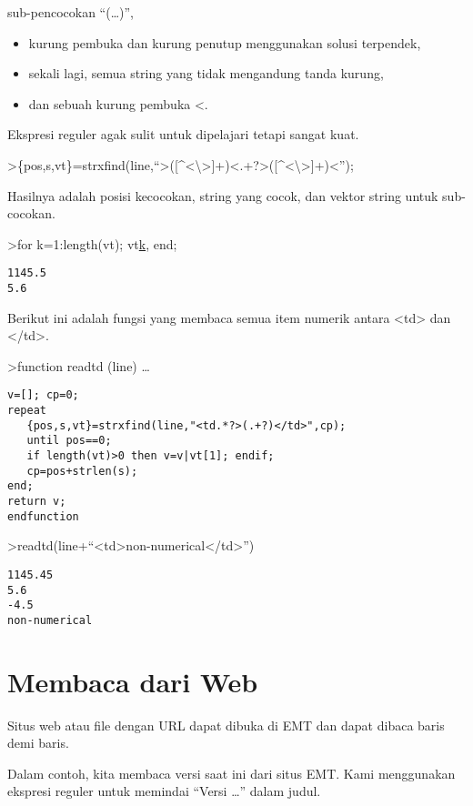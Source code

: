 \documentclass[
]{book}
\begin{document}
sub-pencocokan ``(\ldots)'',

\begin{itemize}
\item
  kurung pembuka dan kurung penutup menggunakan solusi terpendek,
\item
  sekali lagi, semua string yang tidak mengandung tanda kurung,
\item
  dan sebuah kurung pembuka \textless.
\end{itemize}

Ekspresi reguler agak sulit untuk dipelajari tetapi sangat kuat.

\textgreater\{pos,s,vt\}=strxfind(line,``\textgreater({[}\^{}\textless\textbackslash\textgreater{]}+)\textless.+?\textgreater({[}\^{}\textless\textbackslash\textgreater{]}+)\textless{}'');

Hasilnya adalah posisi kecocokan, string yang cocok, dan vektor string untuk sub-cocokan.

\textgreater for k=1:length(vt); vt\href{}{k}, end;

\begin{verbatim}
1145.5
5.6
\end{verbatim}

Berikut ini adalah fungsi yang membaca semua item numerik antara \textless td\textgreater{} dan \textless/td\textgreater.

\textgreater function readtd (line) \ldots{}

\begin{verbatim}
v=[]; cp=0;
repeat
   {pos,s,vt}=strxfind(line,"<td.*?>(.+?)</td>",cp);
   until pos==0;
   if length(vt)>0 then v=v|vt[1]; endif;
   cp=pos+strlen(s);
end;
return v;
endfunction
\end{verbatim}

\textgreater readtd(line+``\textless td\textgreater non-numerical\textless/td\textgreater{}'')

\begin{verbatim}
1145.45
5.6
-4.5
non-numerical
\end{verbatim}

\chapter{Membaca dari Web}\label{membaca-dari-web}

Situs web atau file dengan URL dapat dibuka di EMT dan dapat dibaca baris demi baris.

Dalam contoh, kita membaca versi saat ini dari situs EMT. Kami menggunakan ekspresi reguler untuk memindai ``Versi \ldots{}'' dalam judul.
\end{document}
